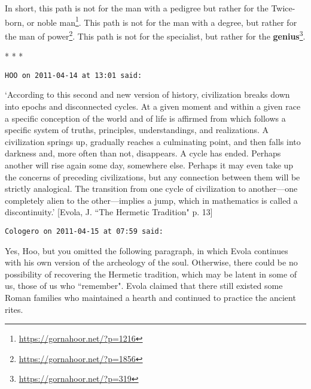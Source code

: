 In short, this path is not for the man with a pedigree but rather for the Twice-born, or noble man\footnote{\url{https://gornahoor.net/?p=1216}}. This path is not for the man with a degree, but rather for the man of power\footnote{\url{https://gornahoor.net/?p=1856}}. This path is not for the specialist, but rather for the \textbf{genius}\footnote{\url{https://gornahoor.net/?p=319}}.




\begin{center}* * *\end{center}

\begin{footnotesize}\begin{sffamily}

\texttt{HOO on 2011-04-14 at 13:01 said: }

`According to this second and new version of history, civilization breaks down into epochs and disconnected cycles. At a given moment and within a given race a specific conception of the world and of life is affirmed from which follows a specific system of truths, principles, understandings, and realizations. A civilization springs up, gradually reaches a culminating point, and then falls into darkness and, more often than not, disappears. A cycle has ended. Perhaps another will rise again some day, somewhere else. Perhaps it may even take up the concerns of preceding civilizations, but any connection between them will be strictly analogical. The transition from one cycle of civilization to another—one completely alien to the other—implies a jump, which in mathematics is called a discontinuity.' [Evola, J. ``The Hermetic Tradition" p. 13]


\hfill


\texttt{Cologero on 2011-04-15 at 07:59 said: }

Yes, Hoo, but you omitted the following paragraph, in which Evola continues with his own version of the archeology of the soul. Otherwise, there could be no possibility of recovering the Hermetic tradition, which may be latent in some of us, those of us who ``remember". Evola claimed that there still existed some Roman families who maintained a hearth and continued to practice the ancient rites.


\end{sffamily}\end{footnotesize}
